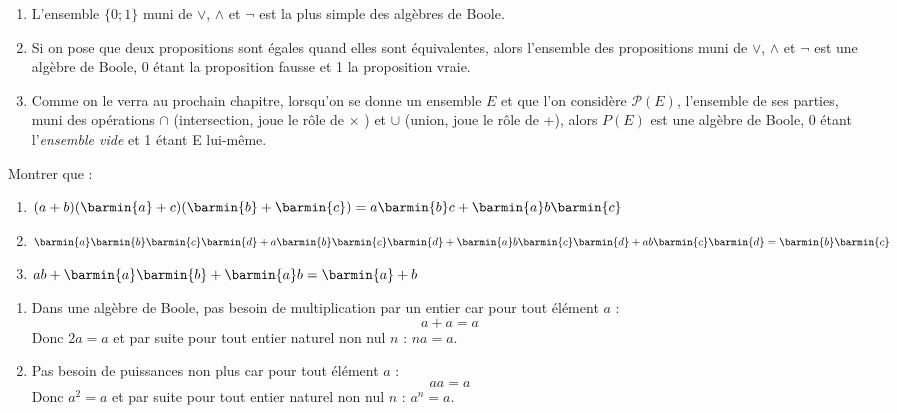 \documentclass[a4paper,12pt,french]{book}
\begin{document}
	\begin{exemple}[s]
		\begin{enumerate}[\textbullet]
			\item 	L'ensemble $\{0;1\}$ muni de $\vee$, $\wedge$ et $\neg$ est la plus simple des algèbres de Boole.
			\item 	Si on pose que deux propositions sont égales quand elles sont équivalentes, alors l'ensemble des propositions muni de $\vee$, $\wedge$ et $\neg$ est une algèbre de Boole,
					0 étant la proposition fausse et 1 la proposition vraie.
			\item 	Comme on le verra au prochain chapitre, lorsqu'on se donne un ensemble $E$ et que l'on considère $\mathcal{P}(E)$, l'ensemble de ses parties, muni des opérations $\cap$ (intersection, joue le rôle de $\times$ ) et $\cup$ (union, joue le rôle de +), alors $P(E)$ est une algèbre de Boole, 0 étant l'\textit{ensemble vide} et 1 étant E lui-même.
		\end{enumerate}
	\end{exemple}

	\begin{exercice}[]
		Montrer que :
		\begin{enumerate}[\bfseries a.]
			\item 	$(a+b)(\barmin{a}+c)(\barmin{b}+\barmin{c})=a\barmin{b}c+\barmin{a}b\barmin{c}$
			\item 	$\barmin{a}\barmin{b}\barmin{c}\barmin{d}+a\barmin{b}\barmin{c}\barmin{d}+	\barmin{a}b\barmin{c}\barmin{d}+ab\barmin{c}\barmin{d}=\barmin{b}\barmin{c}$
			\item 	$ab+\barmin{a}\barmin{b}+ \barmin{a}b=\barmin{a}+b$

		\end{enumerate}
	\end{exercice}

	\begin{propriete}[s]
		\begin{enumerate}[\textbullet]
			\item 			Dans une algèbre de Boole, pas besoin de multiplication par un entier car pour tout élément $a$ :
			$$a+a = a$$
			Donc $2a = a$ et par suite pour tout entier naturel non nul $n$ : $na=a$.
			\item Pas besoin de puissances non plus  car pour tout élément $a$ :
			$$aa = a$$
			Donc $a^2 = a$ et par suite pour tout entier naturel non nul $n$ : $a^n=a$.\\

		\end{enumerate}
	\end{propriete}
\end{document}
